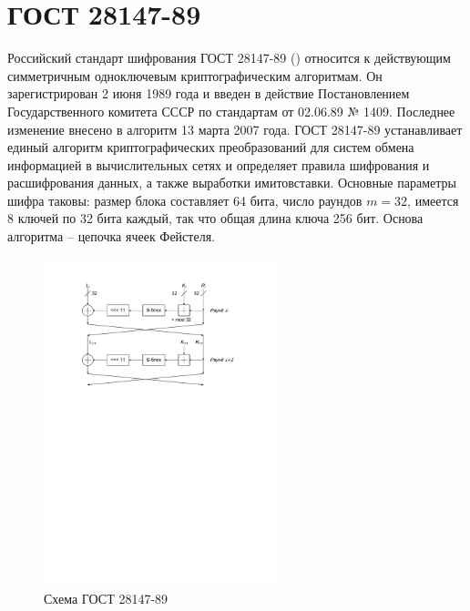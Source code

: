 \section{ГОСТ 28147-89}

Российский стандарт шифрования ГОСТ 28147-89 (\cite{GOST-89}) относится к действующим симметричным одноключевым криптографическим алгоритмам. Он зарегистрирован 2 июня 1989 года и введен в действие Постановлением Государственного комитета СССР по стандартам от 02.06.89 № 1409.
Последнее изменение внесено в алгоритм 13 марта 2007 года.
ГОСТ 28147-89 устанавливает единый алгоритм криптографических преобразований для систем обмена информацией в вычислительных сетях и определяет правила шифрования и расшифрования данных, а также выработки имитовставки. Основные параметры шифра таковы: размер блока составляет 64 бита, число раундов $m=32$, имеется 8 ключей по 32 бита каждый, так что общая длина ключа 256 бит. Основа алгоритма -- цепочка ячеек Фейстеля.

\begin{figure}[!ht]
    \centering
    \includegraphics[width=0.6\textwidth]{pic/gost-28147-89}
    \caption{Схема ГОСТ 28147-89\label{fig:gost-28147-89}}
\end{figure}

